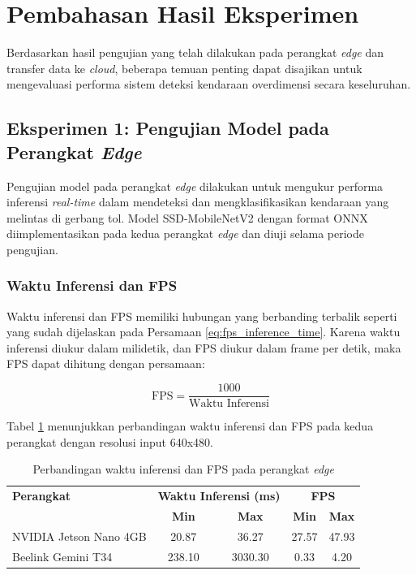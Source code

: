 \section{Pembahasan Hasil Eksperimen}
\label{sec:pembahasanhasileksperimen}

Berdasarkan hasil pengujian yang telah dilakukan pada perangkat \emph{edge} dan transfer data ke \emph{cloud}, beberapa temuan penting dapat disajikan untuk mengevaluasi performa sistem deteksi kendaraan overdimensi secara keseluruhan.

\subsection{Eksperimen 1: Pengujian Model pada Perangkat \emph{Edge}}
\label{sec:eksperimen1}

Pengujian model pada perangkat \emph{edge} dilakukan untuk mengukur performa inferensi \emph{real-time} dalam mendeteksi dan mengklasifikasikan kendaraan yang melintas di gerbang tol. Model SSD-MobileNetV2 dengan format ONNX diimplementasikan pada kedua perangkat \emph{edge} dan diuji selama periode pengujian.

\subsubsection{Waktu Inferensi dan FPS}

Waktu inferensi dan FPS memiliki hubungan yang berbanding terbalik seperti yang sudah dijelaskan pada Persamaan \ref{eq:fps_inference_time}. Karena waktu inferensi diukur dalam milidetik, dan FPS diukur dalam frame per detik, maka FPS dapat dihitung dengan persamaan:

\begin{equation}
  \mbox{FPS} = \frac{1000}{\mbox{Waktu Inferensi}}
\end{equation}

Tabel \ref{tab:inference_time} menunjukkan perbandingan waktu inferensi dan FPS pada kedua perangkat dengan resolusi input 640x480.

\begin{table}[htbp]
  \centering
  \caption{Perbandingan waktu inferensi dan FPS pada perangkat \emph{edge}}
  \label{tab:inference_time}
  \setlength{\tabcolsep}{4pt}
  \small
  \begin{tabular}{|l|c|c|c|c|}
  \hline
  \rowcolor[HTML]{C0C0C0}
  \textbf{Perangkat} & \multicolumn{2}{c|}{\textbf{Waktu Inferensi (ms)}} & \multicolumn{2}{c|}{\textbf{FPS}} \\
  \cline{2-5}
  \rowcolor[HTML]{C0C0C0}
  & \textbf{Min} & \textbf{Max} & \textbf{Min} & \textbf{Max} \\
  \hline
  NVIDIA Jetson Nano 4GB & 20.87 & 36.27 & 27.57 & 47.93 \\
  \hline
  Beelink Gemini T34 & 238.10 & 3030.30 & 0.33 & 4.20 \\
  \hline
  \end{tabular}
\end{table}

